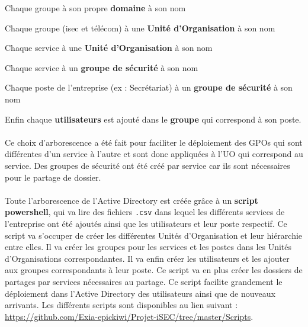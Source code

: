 		\begin{description}
			\item Chaque groupe à son propre \textbf{domaine} à son nom
			\item Chaque groupe (isec et télécom) à une \textbf{Unité d'Organisation} à son nom
			\item Chaque service à une \textbf{Unité d'Organisation} à son nom
			\item Chaque service à un \textbf{groupe de sécurité} à son nom 
			\item Chaque poste de l'entreprise (ex : Secrétariat) à un \textbf{groupe de sécurité} à son nom
			\item Enfin chaque \textbf{utilisateurs} est ajouté dans le \textbf{groupe} qui correspond à son poste. 
		\end{description}

		\paragraph{}
			Ce choix d'arborescence a été fait pour faciliter le déploiement des GPOs qui sont différentes d'un service à l'autre et sont donc appliquées à l'UO qui correspond au service. Des groupes de sécurité ont été créé par service car ils sont nécessaires pour le partage de dossier. 

		\paragraph{}
			Toute l'arborescence de l'Active Directory est créée grâce à un \textbf{script powershell}, qui va lire des fichiers \texttt{.csv} dans lequel les différents services de l'entreprise ont été ajoutés ainsi que les utilisateurs et leur poste respectif. Ce script va s'occuper de créer les différentes Unités d'Organisation et leur hiérarchie entre elles. Il va créer les groupes pour les services et les postes dans les Unités d'Organisations correspondantes. Il va enfin créer les utilisateurs et les ajouter aux groupes correspondants à leur poste. Ce script va en plus créer les dossiers de partages par services nécessaires au partage. Ce script facilite grandement le déploiement dans l'Active Directory des utilisateurs ainsi que de nouveaux arrivants. Les différents scripts sont disponibles au lien suivant : \href{https://github.com/Exia-epickiwi/Projet-iSEC/tree/master/Scripts}{https://github.com/Exia-epickiwi/Projet-iSEC/tree/master/Scripts}.
